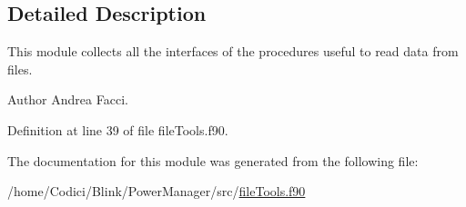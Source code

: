 \subsection{Detailed Description}
This module collects all the interfaces of the procedures useful to read data from files. \begin{DoxyAuthor}{Author}
Andrea Facci. 
\end{DoxyAuthor}


Definition at line 39 of file file\-Tools.\-f90.



The documentation for this module was generated from the following file\-:\begin{DoxyCompactItemize}
\item 
/home/\-Codici/\-Blink/\-Power\-Manager/src/\hyperlink{file_tools_8f90}{file\-Tools.\-f90}\end{DoxyCompactItemize}
